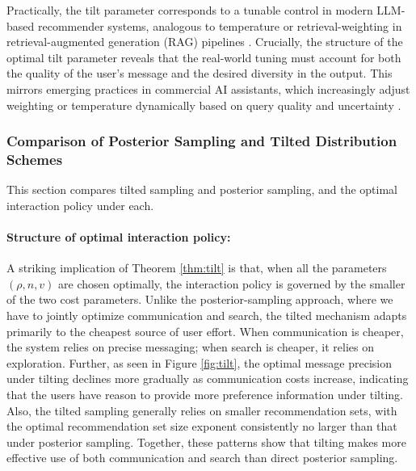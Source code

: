 \documentclass[12pt]{article}
\theoremstyle{definition}
\theoremstyle{remark}
\begin{document}
Practically, the tilt parameter corresponds to a tunable control in modern LLM-based recommender systems, analogous to temperature or retrieval-weighting in retrieval-augmented generation (RAG) pipelines \citep{lewis2020retrieval, gao2023retrieval}.  Crucially, the structure of the optimal tilt parameter reveals that the real-world tuning must account for both the quality of the user's message and the desired diversity in the output. This mirrors emerging practices in commercial AI assistants, which increasingly adjust weighting or temperature dynamically based on query quality and uncertainty \citep{wu2024survey, bao2024large}.

\subsubsection{Comparison of Posterior Sampling and Tilted Distribution Schemes}
\label{sec:post_tilt_comparision}
This section compares tilted sampling and posterior sampling, and the optimal interaction policy under each.

\paragraph{Structure of optimal interaction policy:} A striking implication of Theorem \ref{thm:tilt} is that, when all the parameters $(\rho,n,v)$ are chosen optimally, the interaction policy is governed by the smaller of the two cost parameters. Unlike the posterior-sampling approach, where we have to jointly optimize communication and search, the tilted mechanism adapts primarily to the cheapest source of user effort. When communication is cheaper, the system relies on precise messaging; when search is cheaper, it relies on exploration. Further, as seen in Figure \ref{fig:tilt}, the optimal message precision under tilting declines more gradually as communication costs increase, indicating that the users have reason to provide more preference information under tilting.
Also, the tilted sampling generally relies on smaller recommendation sets, with the optimal recommendation set size exponent consistently no larger than that under posterior sampling. Together, these patterns show that tilting makes more effective use of both communication and search than direct posterior sampling.
\end{document}
